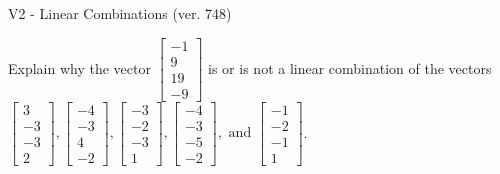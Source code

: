 \begin{exercise}
  \begin{exerciseTitle}V2 - Linear Combinations (ver. 748)\end{exerciseTitle}
  \begin{exerciseStatement}
    Explain why the vector \(\left[\begin{array}{c}
-1 \\
9 \\
19 \\
-9
\end{array}\right]\)  is or is not a linear 
	combination of the vectors \(\left[\begin{array}{c}
3 \\
-3 \\
-3 \\
2
\end{array}\right] , \left[\begin{array}{c}
-4 \\
-3 \\
4 \\
-2
\end{array}\right] , \left[\begin{array}{c}
-3 \\
-2 \\
-3 \\
1
\end{array}\right] , \left[\begin{array}{c}
-4 \\
-3 \\
-5 \\
-2
\end{array}\right] , \text{ and } \left[\begin{array}{c}
-1 \\
-2 \\
-1 \\
1
\end{array}\right]\).
	



\end{exerciseStatement}
\end{exercise}
